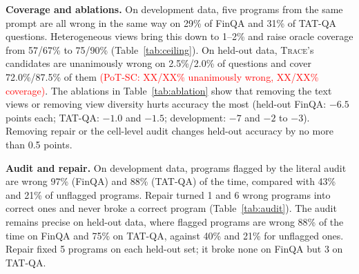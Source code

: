 \documentclass[conference]{IEEEtran}
\newcommand{\trace}{\textsc{Trace}}
\newcommand{\TBD}[1]{\textcolor{red}{#1}}
\begin{document}
\begin{table}[t]
\centering
\caption{The selection ceiling: oracle coverage (\%), distinct answers per question, and questions where all candidates are identically wrong (\%).}
\label{tab:ceiling}
\footnotesize
\setlength{\tabcolsep}{3pt}

\end{table}

\begin{table}[t]
\centering
\caption{Ablations of \trace{}'s candidate generator, replayed exactly from logged calls.}
\label{tab:ablation}
\footnotesize
\setlength{\tabcolsep}{2.5pt}

\end{table}

\textbf{Coverage and ablations.} On development data, five programs from the same prompt are all wrong in the same way on 29\% of FinQA and 31\% of TAT-QA questions. Heterogeneous views bring this down to 1--2\% and raise oracle coverage from 57/67\% to 75/90\% (Table~\ref{tab:ceiling}). On held-out data, \trace{}'s candidates are unanimously wrong on 2.5\%/2.0\% of questions and cover 72.0\%/87.5\% of them\TBD{ (PoT-SC: XX/XX\% unanimously wrong, XX/XX\% coverage)}. The ablations in Table~\ref{tab:ablation} show that removing the text views or removing view diversity hurts accuracy the most (held-out FinQA: $-6.5$ points each; TAT-QA: $-1.0$ and $-1.5$; development: $-7$ and $-2$ to $-3$). Removing repair or the cell-level audit changes held-out accuracy by no more than 0.5 points.

\begin{table}[t]
\centering
\caption{Literal-level audit and repair: flagged first-pass programs, share wrong among flagged / unflagged programs, repairs (wrong$\to$right / right$\to$wrong), and accuracy and coverage of the two-call accept path.}
\label{tab:audit}
\footnotesize

\end{table}

\textbf{Audit and repair.} On development data, programs flagged by the literal audit are wrong 97\% (FinQA) and 88\% (TAT-QA) of the time, compared with 43\% and 21\% of unflagged programs. Repair turned 1 and 6 wrong programs into correct ones and never broke a correct program (Table~\ref{tab:audit}). The audit remains precise on held-out data, where flagged programs are wrong 88\% of the time on FinQA and 75\% on TAT-QA, against 40\% and 21\% for unflagged ones. Repair fixed 5 programs on each held-out set; it broke none on FinQA but 3 on TAT-QA.
\end{document}
